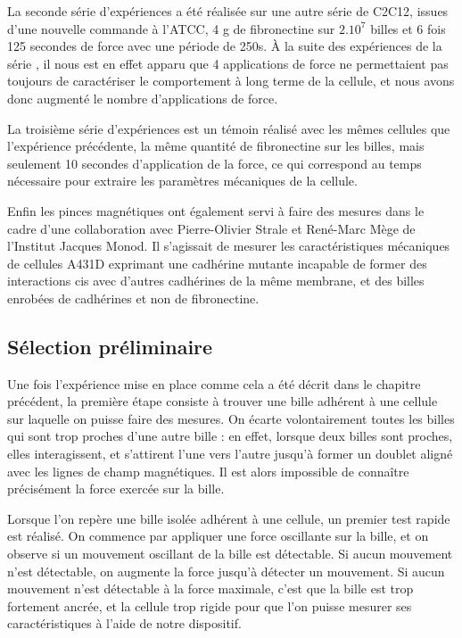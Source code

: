La seconde série d'expériences a été réalisée sur une autre série de C2C12, issues d'une nouvelle commande à l'ATCC, 4 \micro g de fibronectine sur $2.10^7$ billes et 6 fois 125 secondes de force avec une période de 250s. 
À la suite des expériences de la série , il nous est en effet apparu que 4 applications de force ne permettaient pas toujours de caractériser le comportement à long terme de la cellule, et nous avons donc augmenté le nombre d'applications de force. 

La troisième série d'expériences est un témoin réalisé avec les mêmes cellules que l'expérience précédente, la même quantité de fibronectine sur les billes, mais seulement 10 secondes d'application de la force, ce qui correspond au temps nécessaire pour extraire les paramètres mécaniques de la cellule. 


Enfin les pinces magnétiques ont également servi à faire des mesures dans le cadre d'une collaboration avec Pierre-Olivier Strale et René-Marc Mège de l'Institut Jacques Monod. Il s'agissait de mesurer les caractéristiques mécaniques de cellules A431D exprimant une cadhérine mutante incapable de former des interactions cis avec d'autres cadhérines de la même membrane, et des billes enrobées de cadhérines et non de fibronectine. 


\subsection{Sélection préliminaire}

Une fois l'expérience mise en place comme cela a été décrit dans le chapitre précédent, la première étape consiste à trouver une bille adhérent à une cellule sur laquelle on puisse faire des mesures. 
On écarte volontairement toutes les billes qui sont trop proches d'une autre bille : en effet, lorsque deux billes sont proches, elles interagissent, et s'attirent l'une vers l'autre jusqu'à former un doublet aligné avec les lignes de champ magnétiques. Il est alors impossible de connaître précisément la force exercée sur la bille. 

Lorsque l'on repère une bille isolée adhérent à une cellule, un premier test rapide est réalisé.
On commence par appliquer une force oscillante sur la bille, et on observe si un mouvement oscillant de la bille est détectable. Si aucun mouvement n'est détectable, on augmente la force jusqu'à détecter un mouvement. Si aucun mouvement n'est détectable à la force maximale, c'est que la bille est trop fortement ancrée, et la cellule trop rigide pour que l'on puisse mesurer ses caractéristiques à l'aide de notre dispositif. 

